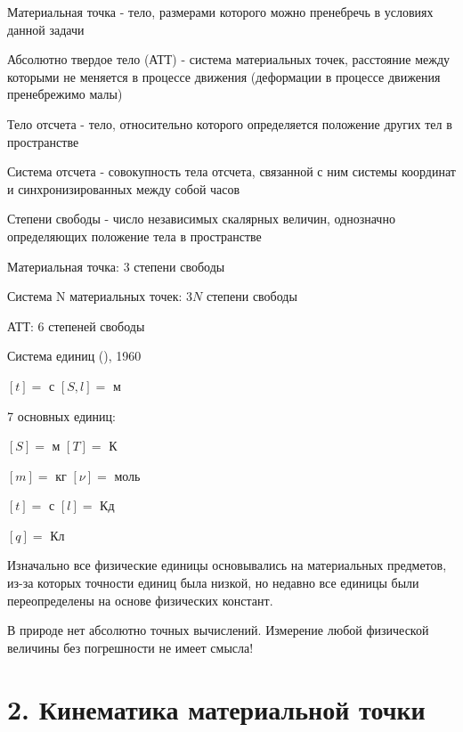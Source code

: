 \documentclass[12pt]{article}
\begin{document}
    Материальная точка - тело, размерами которого можно пренебречь в условиях данной задачи

    Абсолютно твердое тело (АТТ) - система материальных точек, расстояние между которыми не меняется
    в процессе движения (деформации в процессе движения пренебрежимо малы)

    Тело отсчета - тело, относительно которого определяется положение других тел в пространстве

    Система отсчета - совокупность тела отсчета, связанной с ним системы координат и синхронизированных между собой часов


    Степени свободы - число независимых скалярных величин, однозначно определяющих положение тела в пространстве

    Материальная точка: $3$ степени свободы

    Система N материальных точек: $3N$ степени свободы

    АТТ: $6$ степеней свободы

    Система единиц (), 1960

    $[t] = $ с \quad $[S, l] = $ м

    7 основных единиц:

    $[S] = $ м \quad $[T] = $ К

    $[m] = $ кг \quad $[\nu] = $ моль

    $[t] = $ с \quad $[l] = $ Кд

    $[q] = $ Кл

    Изначально все физические единицы основывались на материальных предметов, из-за которых точности единиц была низкой,
    но недавно все единицы были переопределены на основе физических констант.

    В природе нет абсолютно точных вычислений. Измерение любой физической величины без погрешности не имеет смысла!


    \section{2. Кинематика материальной точки}
\end{document}

